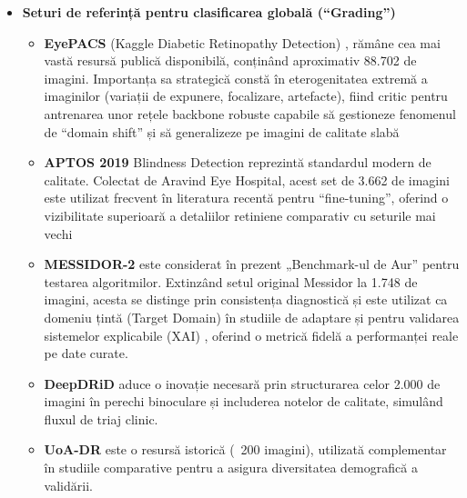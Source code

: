 \documentclass[12pt, a4paper, oneside, romanian]{teza-upb}
\begin{document}
\begin{itemize}
  \item \textbf{Seturi de referință pentru clasificarea globală (“Grading”)}
  
      \begin{itemize}
          \item \textbf{EyePACS} (Kaggle Diabetic Retinopathy Detection) \cite{3_gulshan2016development}, \cite{9_chetoui2020explainable} rămâne cea mai 
                vastă resursă publică disponibilă, conținând aproximativ 88.702 de imagini. Importanța sa strategică constă în eterogenitatea
                extremă a imaginilor (variații de expunere, focalizare, artefacte), fiind critic pentru antrenarea unor
                rețele backbone robuste capabile să gestioneze fenomenul de “domain shift” \cite{8_zhang2022multi} și să generalizeze pe
                imagini de calitate slabă

          \item \textbf{APTOS 2019} Blindness Detection \cite{9_chetoui2020explainable} reprezintă standardul modern de calitate. Colectat de Aravind Eye
                Hospital, acest set de 3.662 de imagini este utilizat frecvent în literatura recentă pentru “fine-tuning”,
                oferind o vizibilitate superioară a detaliilor retiniene comparativ cu seturile mai vechi

          \item \textbf{MESSIDOR-2} \cite{9_chetoui2020explainable} este considerat în prezent „Benchmark-ul de Aur” pentru testarea algoritmilor.
                Extinzând setul original Messidor la 1.748 de imagini, acesta se distinge prin consistența diagnostică și
                este utilizat ca domeniu țintă (Target Domain) în studiile de adaptare \cite{8_zhang2022multi} și pentru validarea sistemelor
                explicabile (XAI) \cite{9_chetoui2020explainable}, oferind o metrică fidelă a performanței reale pe date curate.

          \item \textbf{DeepDRiD} \cite{14_liu2022deepdrid} aduce o inovație necesară prin structurarea
                celor 2.000 de imagini în perechi binoculare și includerea notelor de calitate, simulând fluxul de triaj
                clinic.

          \item \textbf{UoA-DR} \cite{9_chetoui2020explainable} este o resursă istorică (~200 imagini), utilizată
                complementar în studiile comparative pentru a asigura diversitatea demografică a validării.
      \end{itemize}


\end{itemize}
\end{document}
